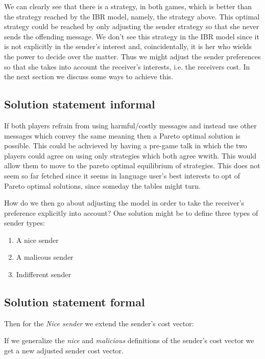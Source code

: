\documentclass[10]{article}
\begin{document}
We can clearly see that there is a strategy, in both games, which is better than the strategy reached by the IBR model, namely, the strategy above. This optimal strategy could be reached by only adjusting the sender strategy so that she never sends the offending message. We don't see this strategy in the IBR model since it is not explicitly in the sender's interest and, coincidentally, it is her who wields the power to decide over the matter. Thus we might adjust the sender preferences so that she takes into account the receiver's interests, i.e. the receivers cost. In the next section we discuss some ways to achieve this.\\

\subsection{Solution statement informal}
If both players refrain from using harmful/costly messages and instead use other messages which convey the same meaning then a Pareto optimal solution is possible. This could be achvieved by having a pre-game talk in which the two players could agree on using only strategies which both agree wwith. This would allow them to move to the pareto optimal equilibrium of strategies. This does not seem so far fetched since it seems in language user's best interests to opt of Pareto optimal solutions, since someday the tables might turn.

How do we then go about adjusting the model in order to take the receiver's preference explicitly into account? One solution might be to define three types of sender types: \\

\begin{enumerate}
\item A nice sender
\item A malicous sender
\item Indifferent sender
\end{enumerate}

\subsection{Solution statement formal}

Then for the \textit{Nice sender} we extend the sender's cost vector:

If we generalize the \textit{nice} and \textit{malicious} definitions of the sender's cost vector we get a new adjusted sender cost vector.
\end{document}
